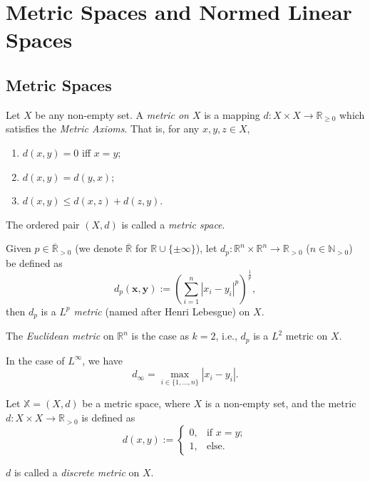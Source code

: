 \chapter{Metric Spaces and Normed Linear Spaces}



\section{Metric Spaces}

\begin{definition}
	\label{def: metric space}
	Let $X$ be any non-empty set. A \textit{metric on $X$} is a mapping $d: X  \times X \to \mathbb R_{\ge 0}$ which satisfies the \textit{Metric Axioms}. That is, for any $x, y, z \in X$,
	\begin{enumerate}
		\item
		\label{def: metric axioms: identity of indiscernibles}
		$d(x,y) = 0$ iff $x = y$;
		
		\item
		\label{def: metric axioms: symmetry}
		$d(x,y) = d(y, x)$;
		
		\item
		\label{def: metric axioms: triangle inequality}
		$d(x,y) \le d(x, z) + d(z, y)$.
	\end{enumerate}
	
	The ordered pair $(X, d)$ is called a \textit{metric space}.
\end{definition}


\begin{example}
	\label{eg: lebesgue metric}
	
	Given $p \in \overline{\mathbb R}_{> 0}$ (we denote $\overline{\mathbb R}$ for $\mathbb R \cup \{ \pm \infty \}$), let $d_p: \mathbb R^n \times \mathbb R^n \to \mathbb R_{>0}$ ($n \in \mathbb N_{> 0}$) be defined as
	$$
	d_p(\mathbf x, \mathbf y) := \left( \sum_{i = 1}^n | x_i - y_i|^p \right)^\frac{1}{p},
	$$
	then $d_p$ is a \textit{$L^p$ metric} (named after Henri Lebesgue) on $X$.
	
	The \textit{Euclidean metric} on $\mathbb R^n$ is the case as $k = 2$, i.e., $d_p$ is a $L^2$ metric on $X$.
	
	In the case of $L^\infty$, we have
	$$
	d_{\infty} = \max_{i \in \{1, \ldots, n\}} |x_i - y_i|.
	$$
\end{example}


\begin{example}
	\label{eg: discrete metric}
	Let $\mathbb X = (X, d)$ be a metric space, where $X$ is a non-empty set, and the metric $d: X \times X \to \mathbb R_{> 0}$ is defined as
	$$
	d(x,y) :=
	\begin{cases}
		0, & \text{if $x = y$}; \\
		1, & \text{else}.
	\end{cases}
	$$
	
	$d$ is called a \textit{discrete metric} on $X$.
\end{example}


